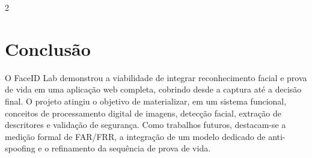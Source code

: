 \documentclass[10pt,a4paper]{article}
\begin{document}
\begin{multicols}{2}
\section{Conclus\~ao}
O FaceID Lab demonstrou a viabilidade de integrar reconhecimento facial e prova de vida em uma aplica\c{c}\~ao web completa, cobrindo desde a captura at\'e a decis\~ao final. O projeto atingiu o objetivo de materializar, em um sistema funcional, conceitos de processamento digital de imagens, detec\c{c}\~ao facial, extra\c{c}\~ao de descritores e valida\c{c}\~ao de seguran\c{c}a. Como trabalhos futuros, destacam-se a medi\c{c}\~ao formal de FAR/FRR, a integra\c{c}\~ao de um modelo dedicado de anti-spoofing e o refinamento da sequ\^encia de prova de vida.

\end{multicols}
\end{document}
